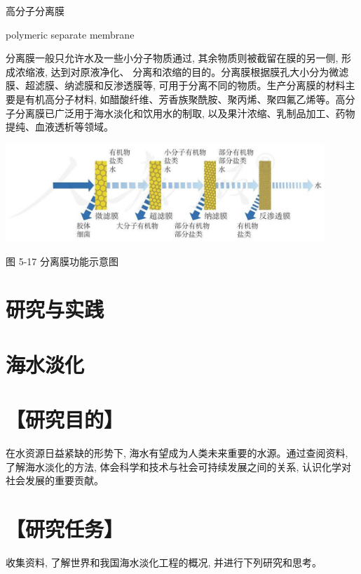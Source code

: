 \documentclass[10pt]{article}
\begin{document}
\begin{mdframed}

高分子分离膜

polymeric separate membrane

\end{mdframed}

分离膜一般只允许水及一些小分子物质通过, 其余物质则被截留在膜的另一侧, 形成浓缩液, 达到对原液净化、 分离和浓缩的目的。分离膜根据膜孔大小分为微滤膜、超滤膜、纳滤膜和反渗透膜等, 可用于分离不同的物质。生产分离膜的材料主要是有机高分子材料, 如醋酸纤维、芳香族聚酰胺、聚丙烯、聚四氟乙烯等。高分子分离膜已广泛用于海水淡化和饮用水的制取, 以及果汁浓缩、乳制品加工、药物提纯、血液透析等领域。

\begin{center}
\includegraphics[max width=0.9\textwidth]{images/0190efc5-b58a-7c43-bfb0-e0a030df9cfd_153_779797.jpg}
\end{center}

图 5-17 分离膜功能示意图

\section*{研究与实践}

\section*{海水淡化}

\section*{【研究目的】}

在水资源日益紧缺的形势下, 海水有望成为人类未来重要的水源。通过查阅资料, 了解海水淡化的方法, 体会科学和技术与社会可持续发展之间的关系, 认识化学对社会发展的重要贡献。

\section*{【研究任务】}

收集资料, 了解世界和我国海水淡化工程的概况, 并进行下列研究和思考。
\end{document}
